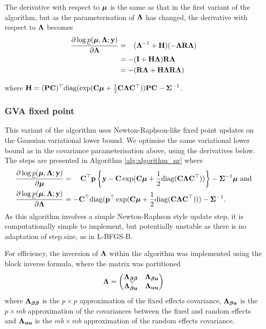	\noindent The derivative with respect to ${\boldsymbol \mu}$ is the same as that in the first variant of the algorithm, but 
	as the parameterisation of ${\boldsymbol \Lambda}$ has changed, the  derivative with respect to ${\boldsymbol \Lambda}$ becomes
	\begin{align*}
		\frac{\partial \log \underline{p}({\boldsymbol \mu}, {\boldsymbol \Lambda}; {\bf y})}{\partial {\boldsymbol\Lambda}}
		  & = \hphantom{-}({\boldsymbol \Lambda}^{-1} + {\bf H})(-{\boldsymbol \Lambda} {\bf R} {\boldsymbol \Lambda}) \\
		  & = -({\bf I} + {\bf H}{\boldsymbol \Lambda}){\bf R}{\boldsymbol \Lambda}                           \\
		  & = - ({\bf R}{\boldsymbol \Lambda} + {\bf H}{\boldsymbol \Lambda}{\bf R}{\boldsymbol \Lambda})                  
	\end{align*} 
			
	\noindent where ${\bf H} = ({\bf P} {\bf C})^\top \text{diag}(\exp({\bf C} {\boldsymbol \mu} + \frac{1}{2} {\bf C} {\boldsymbol \Lambda} {\bf C}^\top)) {\bf P} {\bf C} - {\boldsymbol \Sigma}^{-1}$.
			
	\subsubsection{GVA fixed point}
			
			
	This variant of the algorithm uses Newton-Raphson-like fixed point updates on the Gaussian variational lower
	bound. We optimise the same variational lower bound as in the covariance parameterisation above, using the
	derivatives below. The steps are presented in Algorithm \ref{alg:algorithm_nr} where	
	\begin{align*}
		\frac{\partial \log \underline{p}({\boldsymbol \mu}, {\boldsymbol \Lambda}; {\bf y})}{\partial {\boldsymbol\mu}}     & = \quad {\bf C}^\top{\bf p} \left \{{\bf y} - {\bf C}\exp({\bf C} {\boldsymbol \mu} + \frac{1}{2} \text{diag}({\bf C} {\boldsymbol \Lambda} {\bf C}^\top)) \right \} - {\boldsymbol \Sigma}^{-1} {\boldsymbol \mu} \text{ and} \\
		\frac{\partial \log \underline{p}({\boldsymbol \mu}, {\boldsymbol \Lambda}; {\bf y})}{\partial {\boldsymbol\Lambda}} & = -{\bf C}^\top \text{diag}({\bf p}^\top \exp({\bf C} {\boldsymbol \mu} +\frac{1}{2} \text{diag}({\bf C} {\boldsymbol \Lambda} {\bf C}^\top))) - {\boldsymbol \Sigma}^{-1}.                             
	\end{align*}
	As this algorithm involves a simple Newton-Raphson style update step, it is computationally simple to
	implement, but potentially unstable as there is no adaptation of step size, as in L-BFGS-B.

	For efficiency, the inversion of ${\boldsymbol \Lambda}$ within the algorithm was implemented using the block inverse 
	formula, where	the matrix was partitioned
	\[
		{\boldsymbol \Lambda} =
		\begin{pmatrix}
			{\boldsymbol\Lambda}_{{\boldsymbol \beta} {\boldsymbol \beta}} & {\boldsymbol \Lambda}_{{\boldsymbol \beta} {\bf u}} \\
			{\boldsymbol \Lambda}_{{\boldsymbol \beta} {\bf u}}^\top & {\boldsymbol \Lambda}_{{\bf u} {\bf u}}
		\end{pmatrix}
	\]
	where ${\boldsymbol \Lambda}_{{\boldsymbol \beta} {\boldsymbol \beta}}$ is the $p \times p$ approximation of the fixed effects covariance, ${\boldsymbol \Lambda}_{{\boldsymbol \beta} {\bf u}}$ is the $p \times mb$
	approximation of the covariances between the fixed and random effects and ${\boldsymbol \Lambda}_{{\bf u} {\bf u}}$ is the $mb \times mb$
	approximation of the random effects covariance.

